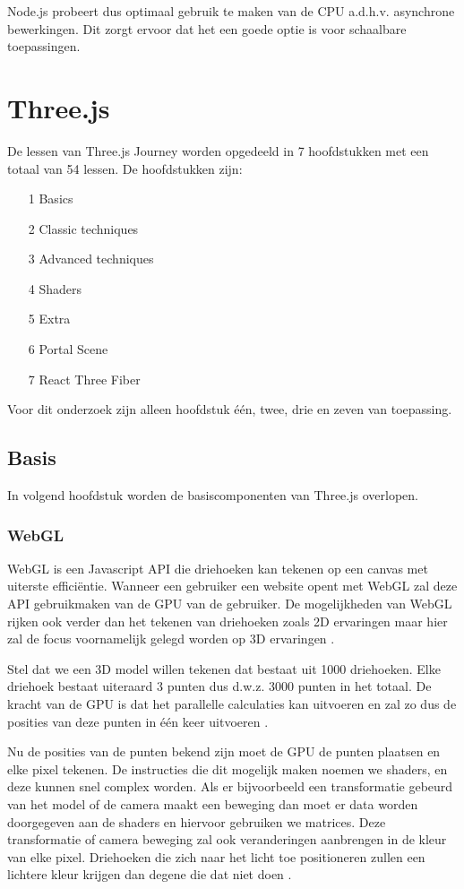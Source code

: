 Node.js probeert dus optimaal gebruik te maken van de CPU a.d.h.v. asynchrone bewerkingen. Dit zorgt ervoor dat het een goede optie is voor schaalbare toepassingen.

\newpage

\section{Three.js}

De lessen van Three.js Journey worden opgedeeld in 7 hoofdstukken met een totaal van 54 lessen. De hoofdstukken zijn:
\begin{itemize}
	\item[1] Basics
	\item[2] Classic techniques
	\item[3] Advanced techniques
	\item[4] Shaders
	\item[5] Extra
	\item[6] Portal Scene
	\item[7] React Three Fiber
\end{itemize}
Voor dit onderzoek zijn alleen hoofdstuk één, twee, drie en zeven van toepassing.

\subsection{Basis}

In volgend hoofdstuk worden de basiscomponenten van Three.js overlopen.

\subsubsection{WebGL}

WebGL is een Javascript API die driehoeken kan tekenen op een canvas met uiterste efficiëntie. Wanneer een gebruiker een website opent met WebGL zal deze API gebruikmaken van de GPU van de gebruiker. De mogelijkheden van WebGL rijken ook verder dan het tekenen van driehoeken zoals 2D ervaringen maar hier zal de focus voornamelijk gelegd worden op 3D ervaringen \autocite{Simon2023}.

Stel dat we een 3D model willen tekenen dat bestaat uit 1000 driehoeken. Elke driehoek bestaat uiteraard 3 punten dus d.w.z. 3000 punten in het totaal. De kracht van de GPU is dat het parallelle calculaties kan uitvoeren en zal zo dus de posities van deze punten in één keer uitvoeren \autocite{Simon2023}.

Nu de posities van de punten bekend zijn moet de GPU de punten plaatsen en elke pixel tekenen. De instructies die dit mogelijk maken noemen we shaders, en deze kunnen snel complex worden. Als er bijvoorbeeld een transformatie gebeurd van het model of de camera maakt een beweging dan moet er data worden doorgegeven aan de shaders en hiervoor gebruiken we matrices. Deze transformatie of camera beweging zal ook veranderingen aanbrengen in de kleur van elke pixel. Driehoeken die zich naar het licht toe positioneren zullen een lichtere kleur krijgen dan degene die dat niet doen \autocite{Simon2023}.

